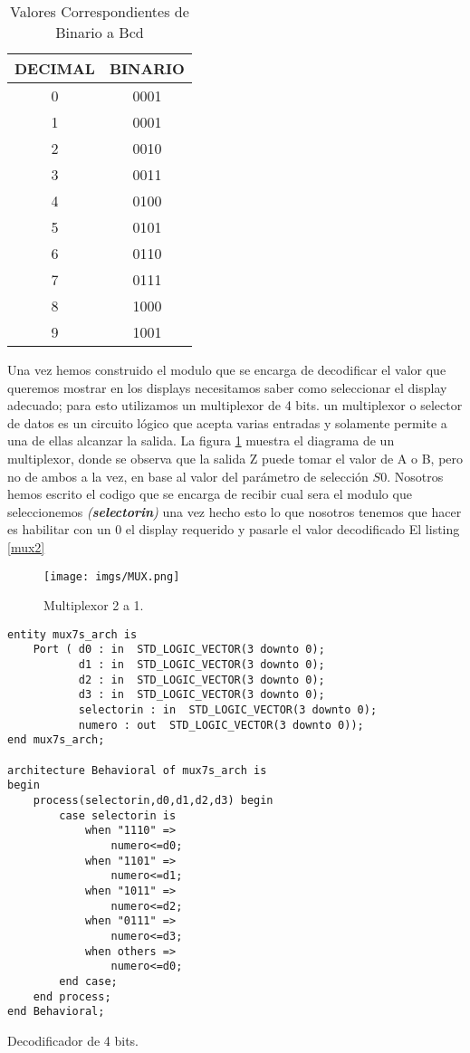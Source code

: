 \documentclass[paper=a4, fontsize=12pt]{article} 		%
\numberwithin{equation}{section}						%
\numberwithin{table}{section} 							%
\begin{document}
\begin{table}[H]
\centering
\begin{tabular}{|c|c|}
\hline
\textbf{DECIMAL} & \textbf{BINARIO} \\ \hline
0                & 0001             \\ \hline
1                & 0001             \\ \hline
2                & 0010             \\ \hline
3                & 0011             \\ \hline
4                & 0100             \\ \hline
5                & 0101             \\ \hline
6                & 0110             \\ \hline
7                & 0111             \\ \hline
8                & 1000             \\ \hline
9                & 1001             \\ \hline
\end{tabular}
\caption{Valores Correspondientes de Binario a Bcd}
\label{my-label}
\end{table}
Una vez hemos construido el modulo que se encarga de decodificar el valor  que queremos mostrar en los displays necesitamos saber como seleccionar el display adecuado; para esto utilizamos un multiplexor de 4 bits. un multiplexor o selector de datos es un circuito lógico que acepta varias entradas y solamente permite a una de ellas alcanzar la salida. La figura \ref{fig:mux} muestra el diagrama de un multiplexor, donde se observa que la salida Z puede tomar el valor de A o B, pero no de ambos a la vez, en base al valor del parámetro de selección $S0$. Nosotros hemos escrito el codigo que se encarga de recibir cual sera el modulo que seleccionemos \textit{(\textbf{selectorin})} una vez hecho esto lo que nosotros tenemos que hacer es habilitar con un 0 el display requerido y pasarle el valor decodificado El listing \ref{mux2}
\begin{figure}[H]
  \centering
     \texttt{[image: imgs/MUX.png]}
  \caption{Multiplexor 2 a 1.}
    \label{fig:mux}
\end{figure}

\begin{listing}[H]
	\begin{verbatim}
entity mux7s_arch is
    Port ( d0 : in  STD_LOGIC_VECTOR(3 downto 0);
           d1 : in  STD_LOGIC_VECTOR(3 downto 0);
           d2 : in  STD_LOGIC_VECTOR(3 downto 0);
           d3 : in  STD_LOGIC_VECTOR(3 downto 0);
           selectorin : in  STD_LOGIC_VECTOR(3 downto 0);
           numero : out  STD_LOGIC_VECTOR(3 downto 0));
end mux7s_arch;

architecture Behavioral of mux7s_arch is
begin
	process(selectorin,d0,d1,d2,d3) begin
		case selectorin is
			when "1110" =>
				numero<=d0;
			when "1101" =>
				numero<=d1;
			when "1011" =>
				numero<=d2;
			when "0111" =>
				numero<=d3;
			when others =>
				numero<=d0;
		end case;
	end process;
end Behavioral;
\end{verbatim}
\caption{Decodificador de 4 bits.}
    \label{mux2}
\end{listing}
\end{document}
